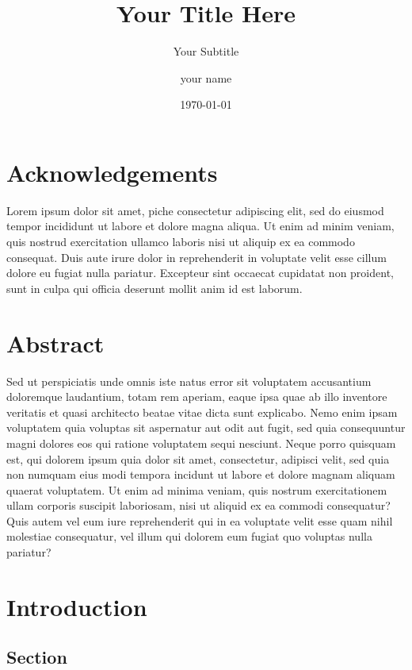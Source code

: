 \documentclass[12pt, twoside]{report}
\title{Your Title Here}
\subtitle{Your Subtitle}
\author{your name}
\date{\today}
\begin{document}
\pagestyle{empty}



\chapter*{Acknowledgements}
\noindent Lorem ipsum dolor sit amet, piche consectetur adipiscing elit, sed do eiusmod tempor incididunt ut labore et dolore magna aliqua.
Ut enim ad minim veniam, quis nostrud exercitation ullamco laboris nisi ut aliquip ex ea commodo consequat.
Duis aute irure dolor in reprehenderit in voluptate velit esse cillum dolore eu fugiat nulla pariatur.
Excepteur sint occaecat cupidatat non proident, sunt in culpa qui officia deserunt mollit anim id est laborum.

\chapter*{Abstract}
\noindent Sed ut perspiciatis unde omnis iste natus error sit voluptatem accusantium doloremque laudantium, totam rem aperiam,
eaque ipsa quae ab illo inventore veritatis et quasi architecto beatae vitae dicta sunt explicabo.
Nemo enim ipsam voluptatem quia voluptas sit aspernatur aut odit aut fugit, sed quia consequuntur magni dolores eos qui ratione voluptatem sequi nesciunt.
Neque porro quisquam est, qui dolorem ipsum quia dolor sit amet, consectetur, adipisci velit, sed quia non numquam eius modi tempora incidunt ut labore et dolore magnam aliquam
quaerat voluptatem. Ut enim ad minima veniam, quis nostrum exercitationem ullam corporis suscipit laboriosam, nisi ut aliquid ex ea commodi consequatur?
Quis autem vel eum iure reprehenderit qui in ea voluptate velit esse quam nihil molestiae consequatur, vel illum qui dolorem eum fugiat quo voluptas nulla pariatur?
\tableofcontents


\pagestyle{plain}

\chapter{Introduction}\label{chp:intro}

\section{Section}
\end{document}
